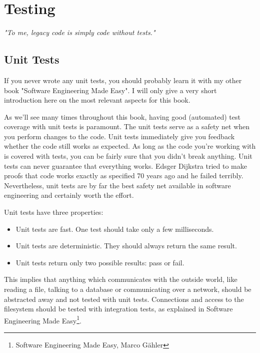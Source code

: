\chapter{Testing}

\textsl{"To me, legacy code is simply code without tests."}


\section{Unit Tests}\label{chap:unittests}

If you never wrote any unit tests, you should probably learn it with my other book "Software Engineering Made Easy". I will only give a very short introduction here on the most relevant aspects for this book.

As we'll see many times throughout this book, having good (automated) test coverage with unit tests is paramount. The unit tests serve as a safety net when you perform changes to the code. Unit tests immediately give you feedback whether the code still works as expected. As long as the code you're working with is covered with tests, you can be fairly sure that you didn't break anything. Unit tests can never guarantee that everything works. Edsger Dijkstra tried to make proofs that code works exactly as specified 70 years ago and he failed terribly. Nevertheless, unit tests are by far the best safety net available in software engineering and certainly worth the effort.

Unit tests have three properties:
\begin{itemize}
    \item Unit tests are fast. One test should take only a few milliseconds.
    \item Unit tests are deterministic. They should always return the same result.
    \item Unit tests return only two possible results: pass or fail.
\end{itemize}

This implies that anything which communicates with the outside world, like reading a file, talking to a database or communicating over a network, should be abstracted away and not tested with unit tests. Connections and access to the filesystem should be tested with integration tests, as explained in Software Engineering Made Easy\footnote{Software Engineering Made Easy, Marco Gähler}.

